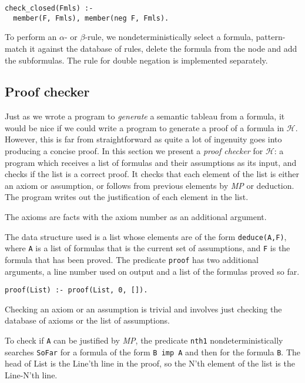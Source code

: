 \documentclass[11pt]{article}
\newcommand*{\p}[1]{\textup{\texttt{#1}}}
\begin{document}
\begin{verbatim}
check_closed(Fmls) :-
  member(F, Fmls), member(neg F, Fmls).
\end{verbatim}

To perform an $\alpha$- or $\beta$-rule, we nondeterministically select
a formula, pattern-match it against the database of rules, delete the
formula from the node and add the subformulas. The rule for double
negation is implemented separately.



\subsection{Proof checker}\label{s.checkprop}

Just as we wrote a program to \emph{generate} a semantic tableau from a
formula, it would be nice if we could write a program to generate a
proof of a formula in $\mathcal{H}$. However, this is far from
straightforward as quite a lot of ingenuity goes into producing a
concise proof. In this section we present a \emph{proof checker}
for $\mathcal{H}$: a program which receives a list of formulas and their
assumptions as its input, and checks if the list is a correct proof. It
checks that each element of the list is either an axiom or assumption,
or follows from previous elements by \emph{MP} or deduction. The program
writes out the justification of each element in the list.
 
The axioms are facts with the axiom number as an additional argument.

The data structure used is a list whose elements are of the form
\p{deduce(A,F)}, where \p{A} is a list of formulas that is the current
set of assumptions, and \p{F} is the formula that has been proved. The
predicate \p{proof} has two additional arguments, a line number used on
output and a list of the formulas proved so far.

\begin{verbatim}
proof(List) :- proof(List, 0, []).
\end{verbatim}

Checking an axiom or an assumption is trivial and involves just checking
the database of axioms or the list of assumptions.

To check if \p{A} can be justified by \emph{MP}, the predicate \p{nth1}
nondeterministically searches \p{SoFar} for a formula of the form \p{B
imp A} and then for the formula \p{B}. The head of List is the Line'th
line in the proof, so the N'th element of the list is the Line-N'th
line.
\end{document}
